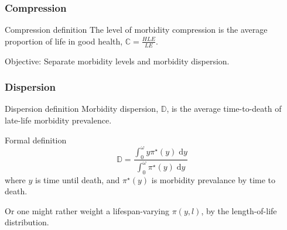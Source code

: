 \documentclass[20pt]{beamer}
\newcommand{\dd}{\; \mathrm{d}}
\begin{document}
\begin{frame}
\frametitle{Compression}
\begin{block}{Compression definition}
The level of morbidity compression is the average proportion of life in good
health, $\mathbb{C} = \frac{HLE}{LE}$.
\end{block}


\pause
\begin{block}{Objective:}
Separate morbidity levels and morbidity dispersion.
\end{block}
\end{frame}

\begin{frame}
\frametitle{Dispersion}
\begin{block}{Dispersion definition}
Morbidity dispersion, $\mathbb{D}$, is the average time-to-death of late-life
morbidity prevalence.
\end{block}
\pause

\begin{block}{Formal definition}
\begin{equation}
\mathbb{D} = \frac{\int_0^{\omega} y \pi^\star(y) \dd
y}{\int_0^{\omega}\pi^\star(y)\dd y}
\end{equation}
where $y$ is time until death, and $\pi^\star(y)$ is morbidity
prevalance by time to death.
\end{block}

\pause
Or one might rather weight a lifespan-varying $\pi(y,l)$, by the length-of-life
distribution.

\end{frame}
\end{document}
